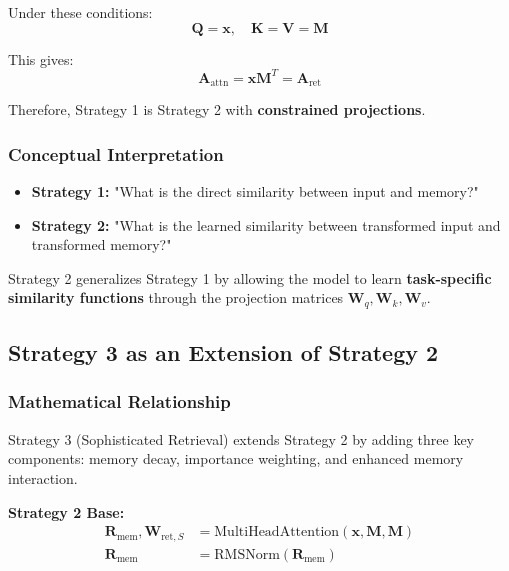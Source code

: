\documentclass{article}
\begin{document}
Under these conditions:
\begin{equation}
\mathbf{Q} = \mathbf{x}, \quad \mathbf{K} = \mathbf{V} = \mathbf{M}
\end{equation}

This gives:
\begin{equation}
\mathbf{A}_{\text{attn}} = \mathbf{x} \mathbf{M}^T = \mathbf{A}_{\text{ret}}
\end{equation}

Therefore, Strategy 1 is Strategy 2 with \textbf{constrained projections}.

\subsubsection{Conceptual Interpretation}

\begin{itemize}
\item \textbf{Strategy 1:} "What is the direct similarity between input and memory?"
\item \textbf{Strategy 2:} "What is the learned similarity between transformed input and transformed memory?"
\end{itemize}

Strategy 2 generalizes Strategy 1 by allowing the model to learn \textbf{task-specific similarity functions} through the projection matrices $\mathbf{W}_q, \mathbf{W}_k, \mathbf{W}_v$.

\subsection{Strategy 3 as an Extension of Strategy 2}

\subsubsection{Mathematical Relationship}

Strategy 3 (Sophisticated Retrieval) extends Strategy 2 by adding three key components: memory decay, importance weighting, and enhanced memory interaction.

\textbf{Strategy 2 Base:}
\begin{align}
\mathbf{R}_{\text{mem}}, \mathbf{W}_{\text{ret},S} &= \text{MultiHeadAttention}(\mathbf{x}, \mathbf{M}, \mathbf{M}) \\
\mathbf{R}_{\text{mem}} &= \text{RMSNorm}(\mathbf{R}_{\text{mem}})
\end{align}
\end{document}
